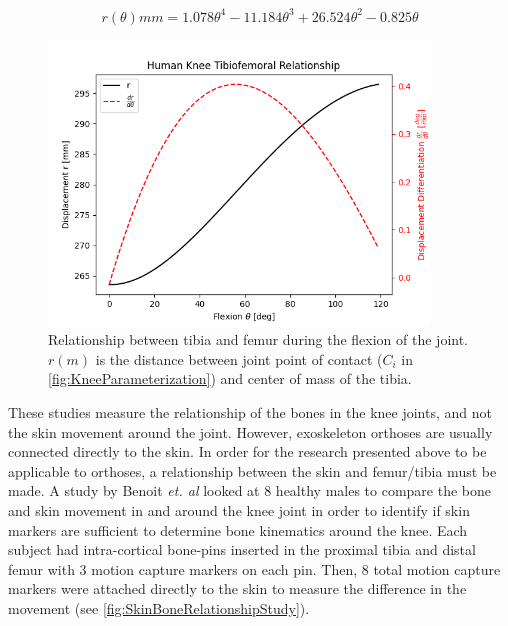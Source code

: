 \begin{equation}
    r(\theta) mm = 1.078\theta^4 - 11.184\theta^3 + 26.524\theta^2 - 0.825\theta
    \label{eq:TibiofemoralRelationship}
\end{equation}

\begin{figure}[ht!]
    \centering
    \includegraphics[width=0.9\textwidth]{Figures/Background/FlexionCurve.png}
    \caption{Relationship between tibia and femur during the flexion of the joint. \(r(m)\) is the distance between joint point of contact (\(C_i\) in \autoref{fig:KneeParameterization}) and center of mass of the tibia.}
    \label{fig:KneeFlexionCurve}
\end{figure}

These studies measure the relationship of the bones in the knee joints, and not the skin movement around the joint. However, exoskeleton orthoses are usually connected directly to the skin. In order for the research presented above to be applicable to orthoses, a relationship between the skin and femur/tibia must be made. A study by Benoit \textit{et. al} looked at 8 healthy males to compare the bone and skin movement in and around the knee joint in order to identify if skin markers are sufficient to determine bone kinematics around the knee. Each subject had intra-cortical bone-pins inserted in the proximal tibia and distal femur with 3 motion capture markers on each pin. Then, 8 total motion capture markers were attached directly to the skin to measure the difference in the movement (see \autoref{fig:SkinBoneRelationshipStudy}). 

